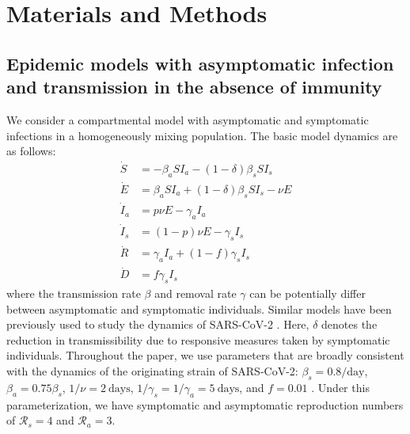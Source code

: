 \documentclass[12pt]{article}
\newcommand{\RR}{\ensuremath{{\mathcal R}}\xspace}
\begin{document}
\section*{Materials and Methods}

\subsection*{Epidemic models with asymptomatic infection and transmission in the absence of immunity}

We consider a compartmental model with asymptomatic and symptomatic infections in a homogeneously mixing population.
The basic model dynamics are as follows:
\begin{align}
\dot{S} &= -\beta_a S I_a -(1-\delta) \beta_s S I_s \\
\dot{E} &= \beta_a S I_a + (1-\delta) \beta_s S I_s - \nu E\\
\dot{I}_a &= p \nu E - \gamma_a I_a\\
\dot{I}_s &= (1-p) \nu E -\gamma_s I_s\\
\dot{R} &= \gamma_a I_a + (1-f) \gamma_s I_s \\
\dot{D} &= f \gamma_s I_s
\end{align}
where the transmission rate $\beta$ and removal rate $\gamma$ can be potentially differ between asymptomatic and symptomatic individuals.  
Similar models have been previously used to study the dynamics of SARS-CoV-2 \citep{fox2020impact,lavezzo2020,harris2023time}.
Here, $\delta$ denotes the reduction in transmissibility due to responsive measures taken by symptomatic individuals.
Throughout the paper, we use parameters that are broadly consistent with the dynamics of the originating strain of SARS-CoV-2: $\beta_s = 0.8/\mathrm{day}$, $\beta_a = 0.75 \beta_s$, $1/\nu=2\ \mathrm{days}$, $1/\gamma_s=1/\gamma_a=5\ \mathrm{days}$, and $f=0.01$ \cite{park2020reconciling}.
Under this parameterization, we have symptomatic and asymptomatic reproduction numbers of $\RR_s = 4$ and $\RR_a = 3$.
\end{document}
